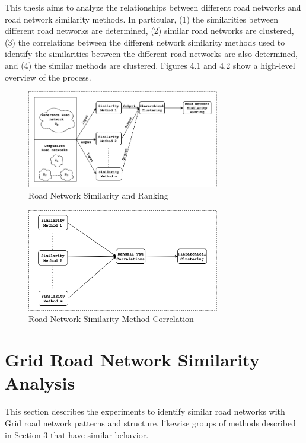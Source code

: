 
This thesis aims to analyze the relationships between different road networks and road network similarity methods. In particular,  (1) the similarities between different road networks are determined, (2) similar road networks are clustered, (3) the correlations between the different network similarity methods used to identify the similarities between the different road networks are also determined, and (4) the similar methods are clustered. Figures 4.1 and 4.2 show a high-level overview of the process. 

\begin{figure}[h]
\centering
\includegraphics[width=0.75\textwidth,center]{picture/network_ranking.png}
\caption[Miniaturtrichter]{Road Network Similarity and Ranking}
\label{fig:Road Network Similarity and Ranking}
\end{figure}

\begin{figure}[!ht]
\centering
\includegraphics[width=0.75\textwidth,center]{picture/ranking.png}
\caption[Miniaturtrichter]{Road Network Similarity Method Correlation}
\label{fig:Road Network Similarity Method Correlation}
\end{figure}


\section{Grid Road Network Similarity Analysis}
This section describes the experiments to identify similar road networks with Grid road network patterns and structure, likewise groups of methods described in Section 3 that have similar behavior.

